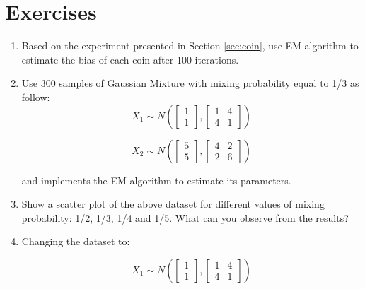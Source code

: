 \section{Exercises}

\begin{enumerate}
    \item Based on the experiment presented in Section \ref{sec:coin}, use EM algorithm to estimate the bias of each coin after 100 iterations.
    \item Use 300 samples of Gaussian Mixture with mixing probability equal to 1/3 as follow:
    \begin{equation*}
        X_1 \sim N\left( \begin{bmatrix} 1 \\ 1 \end{bmatrix}, \begin{bmatrix} 1 & 4 \\ 4 & 1 \end{bmatrix} \right)
    \end{equation*}
    
    \begin{equation*}
        X_2 \sim N\left( \begin{bmatrix} 5 \\ 5 \end{bmatrix}, \begin{bmatrix} 4 & 2 \\ 2 & 6 \end{bmatrix} \right)
    \end{equation*}
    
    \noindent and implements the EM algorithm to estimate its parameters.
    
    \item Show a scatter plot of the above dataset for different values of mixing probability: 1/2, 1/3, 1/4 and 1/5. What can you observe from the results?
    
    \item Changing the dataset to:
    
    \begin{equation*}
        X_1 \sim N\left( \begin{bmatrix} 1 \\ 1 \end{bmatrix}, \begin{bmatrix} 1 & 4 \\ 4 & 1 \end{bmatrix} \right)
    \end{equation*}
    

\end{enumerate}
